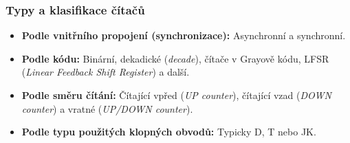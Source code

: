     \subsubsection{Typy a klasifikace čítačů}
        \begin{itemize}
            \item \textbf{Podle vnitřního propojení (synchronizace):} Asynchronní a synchronní.
            \item \textbf{Podle kódu:} Binární, dekadické (\textit{decade}), čítače v Grayově kódu, LFSR (\textit{Linear Feedback Shift Register}) a další.
            \item \textbf{Podle směru čítání:} Čítající vpřed (\textit{UP counter}), čítající vzad (\textit{DOWN counter}) a vratné (\textit{UP/DOWN counter}).
            \item \textbf{Podle typu použitých klopných obvodů:} Typicky D, T nebo JK.
        \end{itemize}
